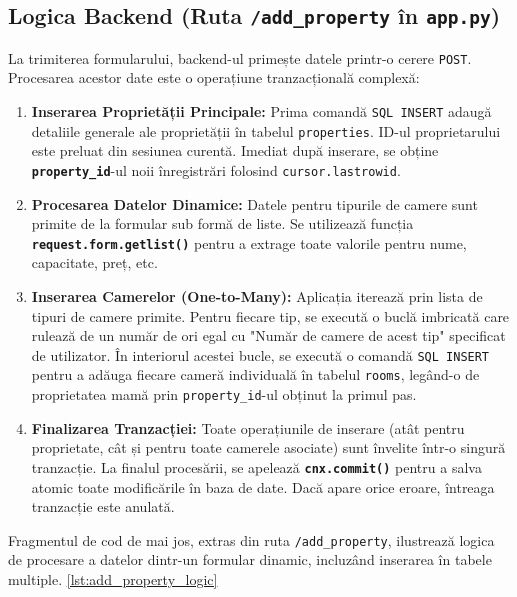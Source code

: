 \documentclass[12pt, a4paper, oneside, romanian]{teza-upb}
\begin{document}
\subsection{Logica Backend (Ruta \texttt{/add\_property} în \texttt{app.py})}
La trimiterea formularului, backend-ul primește datele printr-o cerere \texttt{POST}. Procesarea acestor date este o operațiune tranzacțională complexă:
\begin{enumerate}
	\item \textbf{Inserarea Proprietății Principale:} Prima comandă \texttt{SQL INSERT} adaugă detaliile generale ale proprietății în tabelul \texttt{properties}. ID-ul proprietarului este preluat din sesiunea curentă. Imediat după inserare, se obține \textbf{\texttt{property\_id}}-ul noii înregistrări folosind \texttt{cursor.lastrowid}.
	
	\item \textbf{Procesarea Datelor Dinamice:} Datele pentru tipurile de camere sunt primite de la formular sub formă de liste. Se utilizează funcția \textbf{\texttt{request.form.getlist()}} pentru a extrage toate valorile pentru nume, capacitate, preț, etc.
	
	\item \textbf{Inserarea Camerelor (One-to-Many):} Aplicația iterează prin lista de tipuri de camere primite. Pentru fiecare tip, se execută o buclă imbricată care rulează de un număr de ori egal cu "Număr de camere de acest tip" specificat de utilizator. În interiorul acestei bucle, se execută o comandă \texttt{SQL INSERT} pentru a adăuga fiecare cameră individuală în tabelul \texttt{rooms}, legând-o de proprietatea mamă prin \texttt{property\_id}-ul obținut la primul pas.
	
	\item \textbf{Finalizarea Tranzacției:} Toate operațiunile de inserare (atât pentru proprietate, cât și pentru toate camerele asociate) sunt învelite într-o singură tranzacție. La finalul procesării, se apelează \textbf{\texttt{cnx.commit()}} pentru a salva atomic toate modificările în baza de date. Dacă apare orice eroare, întreaga tranzacție este anulată.
\end{enumerate}


Fragmentul de cod de mai jos, extras din ruta \texttt{/add\_property}, ilustrează logica de procesare a datelor dintr-un formular dinamic, incluzând inserarea în tabele multiple. \ref{lst:add_property_logic}
\end{document}
